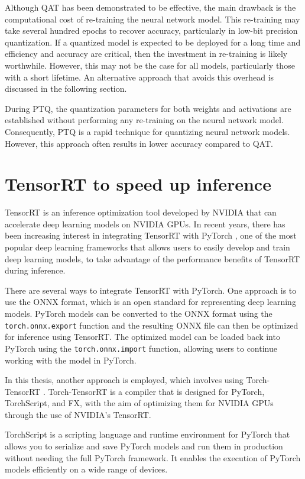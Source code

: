 Although QAT has been demonstrated to be effective, the main drawback is the computational cost of re-training the neural network model. This re-training may take several hundred epochs to recover accuracy, particularly in low-bit precision quantization. If a quantized model is expected to be deployed for a long time and efficiency and accuracy are critical, then the investment in re-training is likely worthwhile. However, this may not be the case for all models, particularly those with a short lifetime. An alternative approach that avoids this overhead is discussed in the following section.

During PTQ, the quantization parameters for both weights and activations are established without performing any re-training on the neural network model. Consequently, PTQ is a rapid technique for quantizing neural network models. However, this approach often results in lower accuracy compared to QAT.

\section{TensorRT to speed up inference}
\label{sec:tensorrt}

TensorRT is an inference optimization tool developed by NVIDIA that can accelerate deep learning models on NVIDIA GPUs. In recent years, there has been increasing interest in integrating TensorRT with PyTorch \cite{NEURIPS2019_9015}, one of the most popular deep learning frameworks that allows users to easily develop and train deep learning models, to take advantage of the performance benefits of TensorRT during inference.
 
There are several ways to integrate TensorRT with PyTorch. One approach is to use the ONNX \cite{bai2019} format, which is an open standard for representing deep learning models. PyTorch models can be converted to the ONNX format using the \texttt{torch.onnx.export} function and the resulting ONNX file can then be optimized for inference using TensorRT. The optimized model can be loaded back into PyTorch using the \texttt{torch.onnx.import} function, allowing users to continue working with the model in PyTorch.

In this thesis, another approach is employed, which involves using Torch-TensorRT \cite{torchtensorrt}. Torch-TensorRT is a compiler that is designed for PyTorch, TorchScript, and FX, with the aim of optimizing them for NVIDIA GPUs through the use of NVIDIA's TensorRT.

TorchScript is a scripting language and runtime environment for PyTorch that allows you to serialize and save PyTorch models and run them in production without needing the full PyTorch framework. It enables the execution of PyTorch models efficiently on a wide range of devices.

